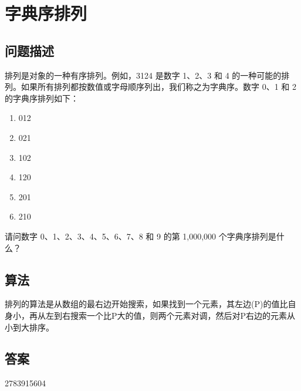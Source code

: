 \section{字典序排列}
\subsection{问题描述}
\begin{tcolorbox}
排列是对象的一种有序排列。例如，3124 是数字 1、2、3 和 4 的一种可能的排列。如果所有排列都按数值或字母顺序列出，我们称之为字典序。数字 0、1 和 2 的字典序排列如下：

\begin{enumerate}
  \item 012
  \item 021
  \item 102
  \item 120
  \item 201
  \item 210
\end{enumerate}

请问数字 0、1、2、3、4、5、6、7、8 和 9 的第 1,000,000 个字典序排列是什么？
\end{tcolorbox}

\subsection{算法}
排列的算法是从数组的最右边开始搜索，如果找到一个元素，其左边(P)的值比自身小，再从左到右搜索一个比P大的值，则两个元素对调，然后对P右边的元素从小到大排序。

\subsection{答案}
2783915604
